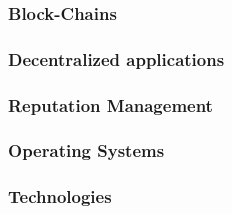 \subsubsection{Block-Chains}

\subsubsection{Decentralized applications}

\subsubsection{Reputation Management}

\subsubsection{Operating Systems}

\subsubsection{Technologies}

